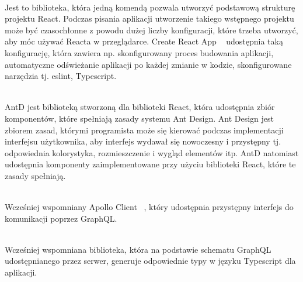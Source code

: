 \begin{description}[leftmargin={15pt},labelindent={0pt}]
  \item[Create React App] \hfill \\ Jest to biblioteka, która jedną komendą pozwala utworzyć podstawową strukturę projektu React. Podczas pisania aplikacji utworzenie takiego wstępnego projektu może być czasochłonne z powodu dużej liczby konfiguracji, które trzeba utworzyć, aby móc używać Reacta w przeglądarce. Create React App ~\cite{ref_cra_doc} udostępnia taką konfigurację, która zawiera np. skonfigurowany proces budowania aplikacji, automatyczne odświeżanie aplikacji po każdej zmianie w kodzie, skonfigurowane narzędzia tj. eslint, Typescript.

  \vspace{0.4cm}

  \item[AntD] \hfill \\ AntD jest biblioteką stworzoną dla biblioteki React, która udostępnia zbiór komponentów, które spełniają zasady systemu Ant Design. Ant Design jest zbiorem zasad, którymi programista może się kierować podczas implementacji interfejsu użytkownika, aby interfejs wydawał się nowoczesny i przystępny tj. odpowiednia kolorystyka, rozmieszczenie i wygląd elementów itp. AntD natomiast udostępnia komponenty zaimplementowane przy użyciu biblioteki React, które te zasady spełniają.

  \vspace{0.4cm}

  \item[Apollo Client] \hfill \\ Wcześniej wspomniany Apollo Client ~\cite{ref_apollo_doc}, który udostępnia przystępny interfejs do komunikacji poprzez GraphQL.

  \vspace{0.4cm}

  \item[GraphQL Code Generator] \hfill \\ Wcześniej wspomniana biblioteka, która na podstawie schematu GraphQL udostępnianego przez serwer, generuje odpowiednie typy w języku Typescript dla aplikacji.

\end{description}

